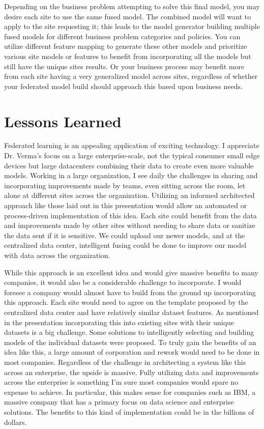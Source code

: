 \documentclass[journal,onecolumn]{IEEEtran}
\begin{document}
Depending on the business problem attempting to solve this final model, you may desire each site to use the same fused model. The combined model will want to apply to the site requesting it; this leads to the model generator building multiple fused models for different business problem categories and policies. You can utilize different feature mapping to generate these other models and prioritize various site models or features to benefit from incorporating all the models but still have the unique sites results. Or your business process may benefit more from each site having a very generalized model across sites, regardless of whether your federated model build should approach this based upon business needs. 

\section{Lessons Learned}

Federated learning is an appealing application of exciting technology. I appreciate Dr. Verma's focus on a large enterprise-scale, not the typical consumer small edge devices but large datacenters combining their data to create even more valuable models. Working in a large organization, I see daily the challenges in sharing and incorporating improvements made by teams, even sitting across the room, let alone at different sites across the organization. Utilizing an informed architected approach like those laid out in this presentation would allow an automated or process-driven implementation of this idea. Each site could benefit from the data and improvements made by other sites without needing to share data or sanitize the data sent if it is sensitive. We could upload our newer models, and at the centralized data center, intelligent fusing could be done to improve our model with data across the organization. 

While this approach is an excellent idea and would give massive benefits to many companies, it would also be a considerable challenge to incorporate. I would foresee a company would almost have to build from the ground up incorporating this approach. Each site would need to agree on the template proposed by the centralized data center and have relatively similar dataset features. As mentioned in the presentation incorporating this into existing sites with their unique datasets is a big challenge. Some solutions to intelligently selecting and building models of the individual datasets were proposed. To truly gain the benefits of an idea like this, a large amount of corporation and rework would need to be done in most companies. Regardless of the challenge in architecting a system like this across an enterprise, the upside is massive. Fully utilizing data and improvements across the enterprise is something I'm sure most companies would spare no expense to achieve. In particular, this makes sense for companies such as IBM, a massive company that has a primary focus on data science and enterprise solutions. The benefits to this kind of implementation could be in the billions of dollars. 
\end{document}
